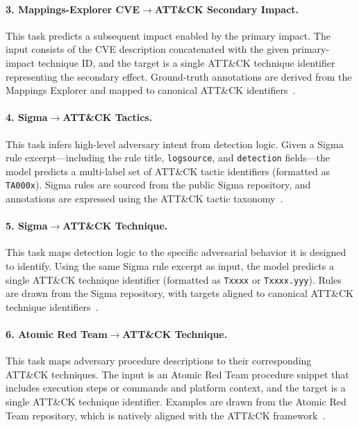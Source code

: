 \paragraph{3. Mappings-Explorer CVE$\rightarrow$ATT\&CK Secondary Impact.}
This task predicts a subsequent impact enabled by the primary impact. The input consists of the CVE description concatenated with the given primary-impact technique ID, and the target is a single ATT\&CK technique identifier representing the secondary effect. Ground-truth annotations are derived from the Mappings Explorer and mapped to canonical ATT\&CK identifiers~\citep{mappings_explorer,mitre_attack}.




\paragraph{4. Sigma$\rightarrow$ATT\&CK Tactics.}
This task infers high-level adversary intent from detection logic. Given a Sigma rule excerpt—including the rule title, \texttt{logsource}, and \texttt{detection} fields—the model predicts a multi-label set of ATT\&CK tactic identifiers (formatted as \texttt{TA000x}). Sigma rules are sourced from the public Sigma repository, and annotations are expressed using the ATT\&CK tactic taxonomy~\citep{sigma,mitre_attack}.

\paragraph{5. Sigma$\rightarrow$ATT\&CK Technique.}
This task maps detection logic to the specific adversarial behavior it is designed to identify. Using the same Sigma rule excerpt as input, the model predicts a single ATT\&CK technique identifier (formatted as \texttt{Txxxx} or \texttt{Txxxx.yyy}). Rules are drawn from the Sigma repository, with targets aligned to canonical ATT\&CK technique identifiers~\citep{sigma,mitre_attack}.








\paragraph{6. Atomic Red Team$\rightarrow$ATT\&CK Technique.}
This task maps adversary procedure descriptions to their corresponding ATT\&CK techniques. The input is an Atomic Red Team procedure snippet that includes execution steps or commands and platform context, and the target is a single ATT\&CK technique identifier. Examples are drawn from the Atomic Red Team repository, which is natively aligned with the ATT\&CK framework~\citep{atomic_red_team,mitre_attack}.

